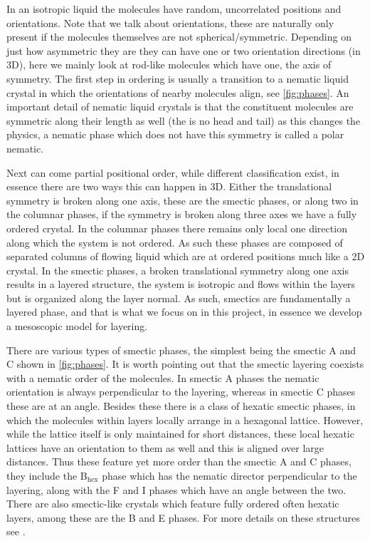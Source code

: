 \documentclass[12pt]{article}
\begin{document}
    In an isotropic liquid the molecules have random, uncorrelated positions and orientations.
    Note that we talk about orientations, these are naturally only present if the molecules themselves are not spherical/symmetric.
    Depending on just how asymmetric they are they can have one or two orientation directions (in 3D), here we mainly look at rod-like molecules which have one, the axis of symmetry.
    The first step in ordering is usually a transition to a nematic liquid crystal in which the orientations of nearby molecules align, see \cref{fig:phases}.
    An important detail of nematic liquid crystals is that the constituent molecules are symmetric along their length as well (the is no head and tail) as this changes the physics, a nematic phase which does not have this symmetry is called a polar nematic.

    Next can come partial positional order, while different classification exist, in essence there are two ways this can happen in 3D.
    Either the translational symmetry is broken along one axis, these are the smectic phases, or along two in the columnar phases\cite{oswaldNematicCholestericLiquid2005}, if the symmetry is broken along three axes we have a fully ordered crystal.
    In the columnar phases there remains only local one direction along which the system is not ordered.
    As such these phases are composed of separated columns of flowing liquid which are at ordered positions much like a 2D crystal.
    In the smectic phases, a broken translational symmetry along one axis results in a layered structure, the system is isotropic and flows within the layers but is organized along the layer normal.
    As such, smectics are fundamentally a layered phase, and that is what we focus on in this project, in essence we develop a mesoscopic model for layering.

    There are various types of smectic phases, the simplest being the smectic A and C shown in \cref{fig:phases}.
    It is worth pointing out that the smectic layering coexists with a nematic order of the molecules.
    In smectic A phases the nematic orientation is always perpendicular to the layering, whereas in smectic C phases these are at an angle.
    Besides these there is a class of hexatic smectic phases, in which the molecules within layers locally arrange in a hexagonal lattice.
    However, while the lattice itself is only maintained for short distances, these local hexatic lattices have an orientation to them as well and this is aligned over large distances.
    Thus these feature yet more order than the smectic A and C phases, they include the B$_\text{hex}$ phase which has the nematic director perpendicular to the layering, along with the F and I phases which have an angle between the two.
    There are also smectic-like crystals which feature fully ordered often hexatic layers, among these are the B and E phases.
    For more details on these structures see \cite{oswaldNematicCholestericLiquid2005,oswaldSmecticColumnarLiquid2005,gennesPhysicsLiquidCrystals1995}.
\end{document}
